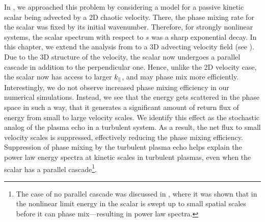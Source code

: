     In , we approached this problem by considering a model for a passive
    kinetic scalar being advected by a 2D chaotic velocity. There, the phase mixing rate
    for the scalar was fixed by its initial wavenumber. Therefore, for strongly
    nonlinear systems, the scalar spectrum with respect to $s$ was a sharp exponential
    decay. 
    In
    this chapter, we extend the analysis from  to a 3D advecting
    velocity field (see ). Due to the 3D structure of the velocity, the scalar now undergoes a
    parallel cascade in addition to the perpendicular one. Hence, unlike the 2D velocity
    case, the scalar now has access to larger $k_\parallel$, and may phase mix more efficiently.
    Interestingly, we do not observe increased phase mixing efficiency in our numerical
    simulations.
    Instead, we see that the energy gets scattered in the phase space in such a
    way, that it generates a significant
    amount of return flux of energy from small to large velocity scales. We identify this
    effect as the stochastic analog of the plasma echo in
    a turbulent system. As a result, the net flux
    to small velocity scales is suppressed, effectively reducing the phase mixing
    efficiency. Suppression of phase mixing by the turbulent plasma echo
    helps explain the power law energy spectra at kinetic scales in turbulent
    plasmas, even when the scalar has a parallel cascade\footnote{The case of no parallel
    cascade was discussed in , where it was shown that in the nonlinear
    limit energy in the scalar is swept up to small spatial scales before it can phase
    mix---resulting in power law spectra.}. 

